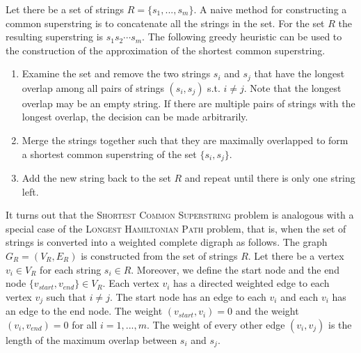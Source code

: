 \documentclass[english,twoside,censored,csm,algorithms-track-2020]{HYthesisML}
\theoremstyle{plain}
\theoremstyle{definition}
\begin{document}

Let there be a set of strings $R=\{s_1,...,s_m\}$. A naive method for constructing a common superstring
is to concatenate all the strings in the set. For the set $R$ the resulting superstring
is $s_1s_2\cdots s_m$.
The following greedy heuristic can be used to the construction of the approximation of the shortest
common superstring.

\begin{enumerate}
\item Examine the set and remove the two strings $s_i$ and $s_j$ that have the longest overlap among all pairs of strings $(s_i, s_j)$ s.t. $i\neq j$. Note that the longest overlap may be an empty string. If there are multiple pairs of strings with the longest overlap, the decision can be made arbitrarily.
\item Merge the strings together such that they are maximally overlapped to form a shortest common superstring of the set $\{s_i, s_j\}$.
  \item Add the new string back to the set $R$ and repeat until there is only one string left.
\end{enumerate}

It turns out that the \textsc{Shortest Common Superstring} problem is analogous with a special case of
the \textsc{Longest Hamiltonian Path} problem, that is, when the set of strings is converted into
a weighted complete digraph as follows. The graph $G_R=(V_R,E_R)$ is constructed from the set of strings $R$.
Let there be a vertex $v_i\in V_R$ for each string $s_i\in R$. Moreover, we define the start node and
the end node $\{v_{start},v_{end}\}\in V_R$. Each vertex $v_i$ has a directed weighted edge to each
vertex
$v_j$ such that $i\neq j$. The start node has an edge to each $v_i$ and each $v_i$ has an edge to the
end node. The weight $(v_{start}, v_i) = 0$ and the weight $(v_i, v_{end}) = 0$ for all $i=1,...,m$.
The weight of every other edge $(v_i, v_j)$ is the length of the maximum overlap between $s_i$ and $s_j$.
\end{document}

